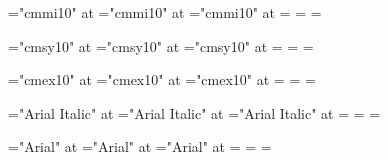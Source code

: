 \font\1="cmmi10" at \largefont
\font\2="cmmi10" at \normalfont
\font\3="cmmi10" at \smallfont
{}=\1 =\2 =\3
\def\mit{\fam=1}

\def\hugesy   {\font\zfontz="cmsy10" at \hugefont   \zfontz}
\def\largesy  {\font\zfontz="cmsy10" at \largefont  \zfontz}
\def\normalsy {\font\zfontz="cmsy10" at \normalfont \zfontz}
\def\smallsy  {\font\zfontz="cmsy10" at \smallfont  \zfontz}
\def\tinysy   {\font\zfontz="cmsy10" at \tinyfont   \zfontz}

\font\1="cmsy10" at \largefont
\font\2="cmsy10" at \normalfont
\font\3="cmsy10" at \smallfont
{}=\1 =\2 =\3
\def\cal{\fam=2}

\def\hugeex   {\font\zfontz="cmex10" at \hugefont   \zfontz}
\def\largeex  {\font\zfontz="cmex10" at \largefont  \zfontz}
\def\normalex {\font\zfontz="cmex10" at \normalfont \zfontz}
\def\smallex  {\font\zfontz="cmex10" at \smallfont  \zfontz}
\def\tinyex   {\font\zfontz="cmex10" at \tinyfont   \zfontz}

\font\1="cmex10" at \largefont
\font\2="cmex10" at \normalfont
\font\3="cmex10" at \smallfont
{}=\1 =\2 =\3

\def\giantit  {\font\zfontz="Arial Italic" at \giantfont  \zfontz}
\def\hugeit   {\font\zfontz="Arial Italic" at \hugefont   \zfontz}
\def\largeit  {\font\zfontz="Arial Italic" at \largefont  \zfontz}
\def\normalit {\font\zfontz="Arial Italic" at \normalfont \zfontz}
\def\smallit  {\font\zfontz="Arial Italic" at \smallfont  \zfontz}
\def\tinyit   {\font\zfontz="Arial Italic" at \tinyfont   \zfontz}

\font\1="Arial Italic" at \largefont
\font\2="Arial Italic" at \normalfont
\font\3="Arial Italic" at \smallfont
{}=\1 =\2 =\3
\def\it{\fam=4}

\def\giantsl  {\font\zfontz="Arial" at \giantfont  \zfontz}
\def\hugesl   {\font\zfontz="Arial" at \hugefont   \zfontz}
\def\largesl  {\font\zfontz="Arial" at \largefont  \zfontz}
\def\normalsl {\font\zfontz="Arial" at \normalfont \zfontz}
\def\smallsl  {\font\zfontz="Arial" at \smallfont  \zfontz}
\def\tinysl   {\font\zfontz="Arial" at \tinyfont   \zfontz}

\font\1="Arial" at \largefont
\font\2="Arial" at \normalfont
\font\3="Arial" at \smallfont
{}=\1 =\2 =\3
\def\sl{\fam=5}

